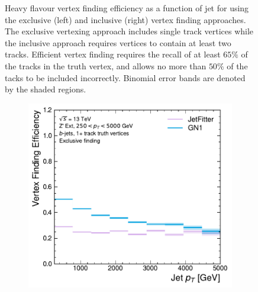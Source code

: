 \begin{figure}[!htbp]
\begin{subfigure}[b]{0.48\textwidth}
    \end{subfigure}
    \caption{
        Heavy flavour vertex finding efficiency as a function of jet \pt for \ttbarbjets using the exclusive (left) and inclusive (right) vertex finding approaches.
        The exclusive vertexing approach includes single track vertices while the inclusive approach requires vertices to contain at least two tracks.
        Efficient vertex finding requires the recall of at least $65\%$ of the tracks in the truth vertex, and allows no more than $50\%$ of the tacks to be included incorrectly.
        Binomial error bands are denoted by the shaded regions.
        }
    \label{fig:ttbar_vert_eff}
\end{figure}

\begin{figure}[!htbp]
    \centering
    \begin{subfigure}[b]{0.48\textwidth}
        \centering
        \includegraphics[width=\textwidth]{chapters/gnn_tagger/figs/results/tracks/zprime/zprime_bjet_vert_eff_1+_track_excl.pdf}
    \end{subfigure}
    \quad
    \begin{subfigure}[b]{0.48\textwidth}
        \centering

\end{subfigure}
\end{figure}
